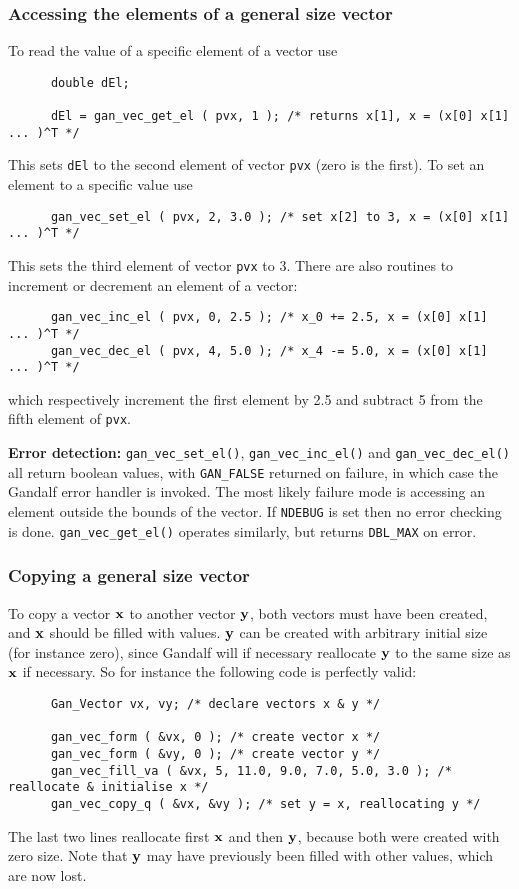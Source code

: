 \subsubsection{Accessing the elements of a general size vector}
To read the value of a specific element of a vector use
\begin{verbatim}
      double dEl;

      dEl = gan_vec_get_el ( pvx, 1 ); /* returns x[1], x = (x[0] x[1] ... )^T */
\end{verbatim}
This sets {\tt dEl} to the second element of vector {\tt pvx}
(zero is the first). To set an element to a specific value use
\begin{verbatim}
      gan_vec_set_el ( pvx, 2, 3.0 ); /* set x[2] to 3, x = (x[0] x[1] ... )^T */
\end{verbatim}
This sets the third element of vector {\tt pvx} to 3.
There are also routines to increment or decrement an element of a vector:
\begin{verbatim}
      gan_vec_inc_el ( pvx, 0, 2.5 ); /* x_0 += 2.5, x = (x[0] x[1] ... )^T */
      gan_vec_dec_el ( pvx, 4, 5.0 ); /* x_4 -= 5.0, x = (x[0] x[1] ... )^T */
\end{verbatim}
which respectively increment the first element by 2.5 and subtract 5 from
the fifth element of {\tt pvx}.

{\bf Error detection:} {\tt gan\_vec\_set\_el()}, {\tt gan\_vec\_inc\_el()}
and {\tt gan\_vec\_dec\_el()} all return boolean values, with {\tt GAN\_FALSE}
returned on failure, in which case the Gandalf error handler is invoked.
The most likely failure mode is accessing an element outside the bounds of
the vector. If {\tt NDEBUG} is set then no error checking is done.
{\tt gan\_vec\_get\_el()} operates similarly, but returns
{\tt DBL\_MAX} on error.

\subsubsection{Copying a general size vector}
To copy a vector ${\bf x}$ to another vector ${\bf y}$, both vectors must have
been created, and ${\bf x}$ should be filled with values. ${\bf y}$ can be
created with arbitrary initial size (for instance zero), since Gandalf will
if necessary reallocate ${\bf y}$ to the same size as ${\bf x}$ if necessary.
So for instance the following code is perfectly valid:
\begin{verbatim}
      Gan_Vector vx, vy; /* declare vectors x & y */

      gan_vec_form ( &vx, 0 ); /* create vector x */
      gan_vec_form ( &vy, 0 ); /* create vector y */
      gan_vec_fill_va ( &vx, 5, 11.0, 9.0, 7.0, 5.0, 3.0 ); /* reallocate & initialise x */
      gan_vec_copy_q ( &vx, &vy ); /* set y = x, reallocating y */
\end{verbatim}
The last two lines reallocate first ${\bf x}$ and then ${\bf y}$, because both
were created with zero size. Note that ${\bf y}$ may have previously been
filled with other values, which are now lost.

